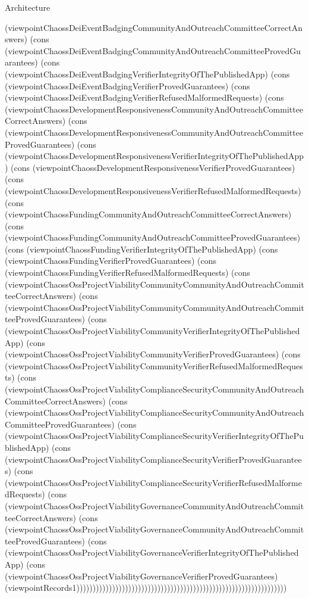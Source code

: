 \begin{lexlean}{Architecture}
\begin{semanticmodule}
{(viewpointChaossDeiEventBadgingCommunityAndOutreachCommitteeCorrectAnswers) (cons (viewpointChaossDeiEventBadgingCommunityAndOutreachCommitteeProvedGuarantees) (cons (viewpointChaossDeiEventBadgingVerifierIntegrityOfThePublishedApp) (cons (viewpointChaossDeiEventBadgingVerifierProvedGuarantees) (cons (viewpointChaossDeiEventBadgingVerifierRefusedMalformedRequests) (cons (viewpointChaossDevelopmentResponsivenessCommunityAndOutreachCommitteeCorrectAnswers) (cons (viewpointChaossDevelopmentResponsivenessCommunityAndOutreachCommitteeProvedGuarantees) (cons (viewpointChaossDevelopmentResponsivenessVerifierIntegrityOfThePublishedApp) (cons (viewpointChaossDevelopmentResponsivenessVerifierProvedGuarantees) (cons (viewpointChaossDevelopmentResponsivenessVerifierRefusedMalformedRequests) (cons (viewpointChaossFundingCommunityAndOutreachCommitteeCorrectAnswers) (cons (viewpointChaossFundingCommunityAndOutreachCommitteeProvedGuarantees) (cons (viewpointChaossFundingVerifierIntegrityOfThePublishedApp) (cons (viewpointChaossFundingVerifierProvedGuarantees) (cons (viewpointChaossFundingVerifierRefusedMalformedRequests) (cons (viewpointChaossOssProjectViabilityCommunityCommunityAndOutreachCommitteeCorrectAnswers) (cons (viewpointChaossOssProjectViabilityCommunityCommunityAndOutreachCommitteeProvedGuarantees) (cons (viewpointChaossOssProjectViabilityCommunityVerifierIntegrityOfThePublishedApp) (cons (viewpointChaossOssProjectViabilityCommunityVerifierProvedGuarantees) (cons (viewpointChaossOssProjectViabilityCommunityVerifierRefusedMalformedRequests) (cons (viewpointChaossOssProjectViabilityComplianceSecurityCommunityAndOutreachCommitteeCorrectAnswers) (cons (viewpointChaossOssProjectViabilityComplianceSecurityCommunityAndOutreachCommitteeProvedGuarantees) (cons (viewpointChaossOssProjectViabilityComplianceSecurityVerifierIntegrityOfThePublishedApp) (cons (viewpointChaossOssProjectViabilityComplianceSecurityVerifierProvedGuarantees) (cons (viewpointChaossOssProjectViabilityComplianceSecurityVerifierRefusedMalformedRequests) (cons (viewpointChaossOssProjectViabilityGovernanceCommunityAndOutreachCommitteeCorrectAnswers) (cons (viewpointChaossOssProjectViabilityGovernanceCommunityAndOutreachCommitteeProvedGuarantees) (cons (viewpointChaossOssProjectViabilityGovernanceVerifierIntegrityOfThePublishedApp) (cons (viewpointChaossOssProjectViabilityGovernanceVerifierProvedGuarantees) (viewpointRecords1)))))))))))))))))))))))))))))))))))))))))))))))))))))))))))))))))
}


\end{semanticmodule}
\end{lexlean}
